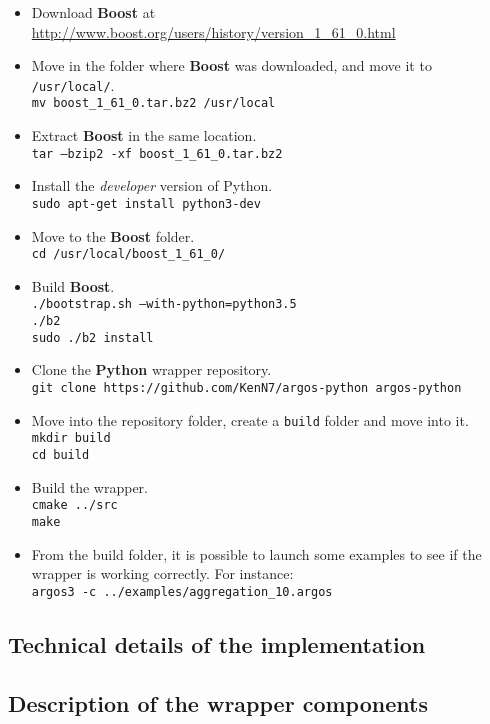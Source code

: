 \documentclass[
12pt,
a4paper,
oneside,
headinclude,
footinclude]{article}
\theoremstyle{definition} %
\begin{document}
\begin{itemize}
    \item Download \textbf{Boost} at \href{http://www.boost.org/users/history/version\_1\_61\_0.html}{http://www.boost.org/users/history/version\_1\_61\_0.html}
    
    \item Move in the folder where \textbf{Boost} was downloaded, and move it to \texttt{/usr/local/}.\\
    \-\quad\texttt{mv boost\_1\_61\_0.tar.bz2 /usr/local}
    
    \item Extract \textbf{Boost} in the same location.\\
    \-\quad\texttt{tar --bzip2 -xf boost\_1\_61\_0.tar.bz2}
    
    \item Install the \textit{developer} version of Python.\\
    \-\quad\texttt{sudo apt-get install python3-dev}   
    
    \item Move to the \textbf{Boost} folder.\\
    \-\quad\texttt{cd /usr/local/boost\_1\_61\_0/}
    
    \item Build \textbf{Boost}.\\
    \-\quad\texttt{./bootstrap.sh --with-python=python3.5}\\
    \-\quad\texttt{./b2}\\
    \-\quad\texttt{sudo ./b2 install}
    
    \item Clone the \textbf{Python} wrapper repository.\\
    \-\quad\texttt{git clone https://github.com/KenN7/argos-python argos-python}
    
    \item Move into the repository folder, create a \texttt{build} folder and move into it.\\
    \-\quad\texttt{mkdir build}\\
    \-\quad\texttt{cd build}
    
    \item Build the wrapper.\\
    \-\quad\texttt{cmake ../src}\\
    \-\quad\texttt{make}
    
    \item From the build folder, it is possible to launch some examples to see if the wrapper is working correctly. For instance:\\
    \-\quad\texttt{argos3 -c ../examples/aggregation\_10.argos}
\end{itemize}

\subsection{Technical details of the implementation}



\subsection{Description of the wrapper components}
\end{document}
